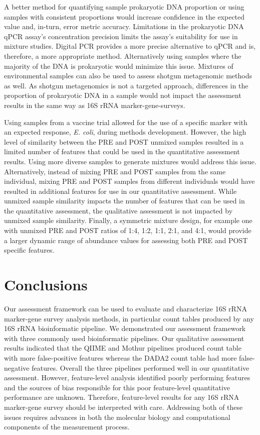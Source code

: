\documentclass[linenumbers]{bmcart}
\begin{document}
A better method for quantifying sample prokaryotic DNA proportion or
using samples with consistent proportions would increase confidence in
the expected value and, in-turn, error metric accuracy. Limitations in the
prokaryotic DNA qPCR assay's concentration precision limits the
assay's suitability for use in mixture studies. Digital PCR provides a
more precise alternative to qPCR and is, therefore, a more appropriate
method. Alternatively using samples where the majority of the DNA is
prokaryotic would minimize this issue. Mixtures of environmental samples
can also be used to assess shotgun metagenomic methods as well. As
shotgun metagenomics is not a targeted approach, differences in the
proportion of prokaryotic DNA in a sample would not impact the
assessment results in the same way as 16S rRNA marker-gene-surveys.

Using samples from a vaccine trial allowed for the use of a specific
marker with an expected response, \emph{E. coli}, during methods
development. However, the high level of similarity between the PRE and POST unmixed
samples resulted in a limited number of features that could be used in
the quantitative assessment results. Using more diverse samples to
generate mixtures would address this issue.
Alternatively, instead of mixing PRE and POST samples from the same individual,
mixing PRE and POST samples from different individuals would
have resulted in additional features for use in our quantitative assessment.
While unmixed sample similarity impacts the number of features
that can be used in the quantitative assessment, the qualitative
assessment is not impacted by unmixed sample similarity.
Finally, a symmetric mixture design, for example one with unmixed
PRE and POST ratios of 1:4, 1:2, 1:1, 2:1, and 4:1, would provide a larger
dynamic range of abundance values for assessing both PRE and POST specific features.


\section*{Conclusions}
Our assessment framework can be used to evaluate and characterize 16S rRNA marker-gene survey analysis methods, in particular count tables produced by any 16S rRNA bioinformatic pipeline.
We demonstrated our assessment framework with three commonly used bioinformatic pipelines.
Our qualitative assessment results indicated that the QIIME and Mothur pipelines produced count table with more false-positive features whereas the DADA2 count table had more false-negative features.
Overall the three pipelines performed well in our quantitative assessment. 
However, feature-level analysis identified poorly performing features and the sources of  
bias responsible for this poor feature-level quantitative performance are unknown. 
Therefore, feature-level results for any 16S rRNA marker-gene survey should be interpreted with care. 
Addressing both of these issues requires advances in both the molecular biology and
computational components of the measurement process.
\end{document}
